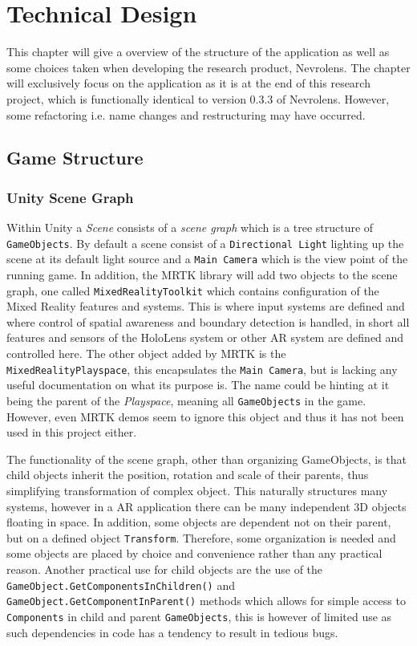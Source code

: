 \chapter{Technical Design}\label{chap:techdesign}

This chapter will give a overview of the structure of the application as well as some choices taken when developing the research product, Nevrolens. The chapter will exclusively focus on the application as it is at the end of this research project, which is functionally identical to version 0.3.3 of Nevrolens. However, some refactoring i.e. name changes and restructuring may have occurred. 

\section{Game Structure}

\subsection*{Unity Scene Graph}

Within Unity a \textit{Scene} consists of a \textit{scene graph} which is a tree structure of \texttt{GameObjects}. By default a scene consist of a \texttt{Directional Light} lighting up the scene at its default light source and a \texttt{Main Camera} which is the view point of the running game. In addition, the MRTK library will add two objects to the scene graph, one called \texttt{MixedRealityToolkit} which contains configuration of the Mixed Reality features and systems. This is where input systems are defined and where control of spatial awareness and boundary detection is handled, in short all features and sensors of the HoloLens system or other AR system are defined and controlled here. The other object added by MRTK is the \texttt{MixedRealityPlayspace}, this encapsulates the \texttt{Main Camera}, but is lacking any useful documentation on what its purpose is. The name could be hinting at it being the parent of the \textit{Playspace}, meaning all \texttt{GameObjects} in the game. However, even MRTK demos seem to ignore this object and thus it has not been used in this project either.

The functionality of the scene graph, other than organizing GameObjects, is that child objects inherit the position, rotation and scale of their parents, thus simplifying transformation of complex object. This naturally structures many systems, however in a AR application there can be many independent 3D objects floating in space. In addition, some objects are dependent not on their parent, but on a defined object \texttt{Transform}. Therefore, some organization is needed and some objects are placed by choice and convenience rather than any practical reason. Another practical use for child objects are the use of the \texttt{GameObject.GetComponentsInChildren()} and \texttt{GameObject.GetComponentInParent()} methods which allows for simple access to \texttt{Components} in child and parent \texttt{GameObjects}, this is however of limited use as such dependencies in code has a tendency to result in tedious bugs.

